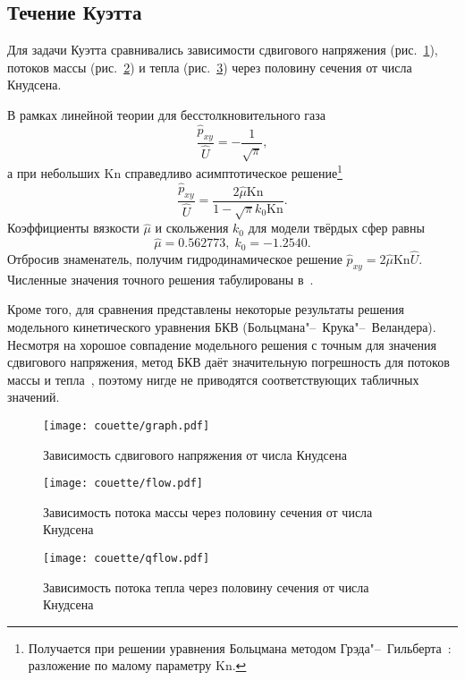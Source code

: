 \documentclass[a4paper,12pt]{article}
\newcommand{\Kn}{\mathrm{Kn}}
\begin{document}
\subsection{Течение Куэтта}

Для задачи Куэтта сравнивались зависимости сдвигового напряжения (рис.~\ref{fig:couette:shear}),
потоков массы (рис.~\ref{fig:couette:flow}) и тепла (рис.~\ref{fig:couette:qflow})
через половину сечения от числа Кнудсена.

В рамках линейной теории для бесстолкновительного газа
\[ \frac{\hat{p}_{xy}}{\hat{U}} = -\frac1{\sqrt{\pi}}, \]
а при небольших \(\Kn\) справедливо асимптотическое решение\footnote
{ Получается при решении уравнения Больцмана методом Грэда"--~Гильберта~\cite{Sone2007}: разложение по малому параметру \(\Kn\). }
\[ \frac{\hat{p}_{xy}}{\hat{U}} = \frac{2\hat{\mu}\Kn}{1-\sqrt{\pi}k_0\Kn}. \]
Коэффициенты вязкости \(\hat{\mu}\) и скольжения \(k_0\) для модели твёрдых сфер равны~\cite{Sone2007}
\[ \hat{\mu} = 0.562773, \; k_0 = -1.2540. \]
Отбросив знаменатель, получим гидродинамическое решение \(\hat{p}_{xy} = 2\hat{\mu}\Kn\hat{U}\).
Численные значения точного решения табулированы в~\cite{Sone1990}.

Кроме того, для сравнения представлены некоторые результаты
решения модельного кинетического уравнения БКВ (Больцмана"--~Крука"--~Веландера).
Несмотря на хорошое совпадение модельного решения с точным для значения сдвигового напряжения,
метод БКВ даёт значительную погрешность для потоков массы и тепла~\cite{Sone1990},
поэтому нигде не приводятся соответствующих табличных значений.

\begin{figure}
    \centering
    \texttt{[image: couette/graph.pdf]}
    \caption{Зависимость сдвигового напряжения от числа Кнудсена}\label{fig:couette:shear}
\end{figure}

\begin{figure}
    \centering
    \texttt{[image: couette/flow.pdf]}
    \caption{Зависимость потока массы через половину сечения от числа Кнудсена}\label{fig:couette:flow}
\end{figure}

\begin{figure}
    \centering
    \texttt{[image: couette/qflow.pdf]}
    \caption{Зависимость потока тепла через половину сечения от числа Кнудсена}\label{fig:couette:qflow}
\end{figure}
\end{document}
